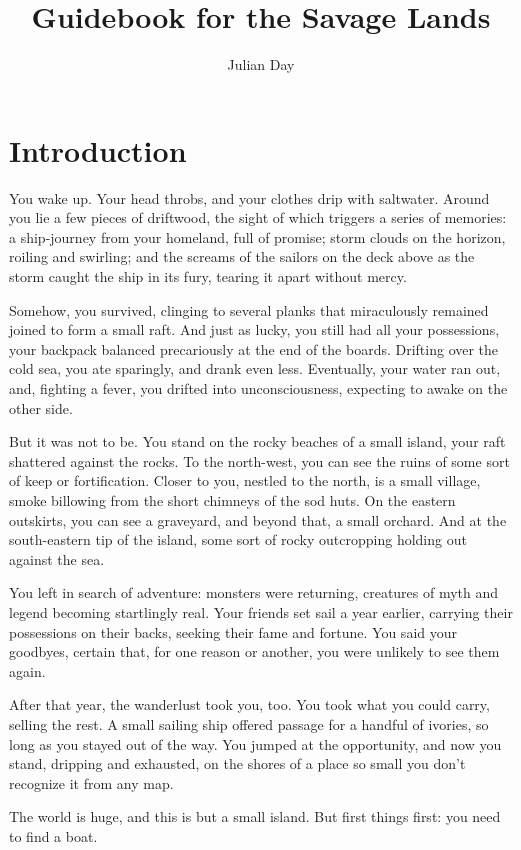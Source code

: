 \documentclass{article}
\begin{document}
\title{Guidebook for the Savage Lands}
\author{Julian Day}
\maketitle
\thispagestyle{empty}

\newpage
\clearpage
\setcounter{page}{1}

\section{Introduction}

You wake up.  Your head throbs, and your clothes drip with saltwater. 
Around you lie a few pieces of driftwood, the sight of which triggers
a series of memories: a ship-journey from your homeland, full of promise;
storm clouds on the horizon, roiling and swirling; and the screams of the
sailors on the deck above as the storm caught the ship in its fury, tearing
it apart without mercy.

Somehow, you survived, clinging to several planks that miraculously
remained joined to form a small raft. And just as lucky, you still had all
your possessions, your backpack balanced precariously at the end of the
boards.  Drifting over the cold sea, you ate sparingly, and drank even
less.  Eventually, your water ran out, and, fighting a fever, you drifted
into unconsciousness, expecting to awake on the other side.

But it was not to be.  You stand on the rocky beaches of a small island,
your raft shattered against the rocks.  To the north-west, you can see the 
ruins of some sort of keep or fortification.  Closer to you, nestled to the
north, is a small village, smoke billowing from the short chimneys of the 
sod huts.  On the eastern outskirts, you can see a graveyard, and beyond 
that, a small orchard.  And at the south-eastern tip of the island, some 
sort of rocky outcropping holding out against the sea.
 
You left in search of adventure: monsters were returning, creatures of myth
and legend becoming startlingly real.  Your friends set sail a year
earlier, carrying their possessions on their backs, seeking their fame and
fortune.  You said your goodbyes, certain that, for one reason or another,
you were unlikely to see them again.

After that year, the wanderlust took you, too.  You took what you could
carry, selling the rest.  A small sailing ship offered passage for a 
handful of ivories, so long as you stayed out of the way.  You
jumped at the opportunity, and now you stand, dripping and exhausted, on the
shores of a place so small you don't recognize it from any map.

The world is huge, and this is but a small island.  But first things first:
you need to find a boat.
\end{document}

